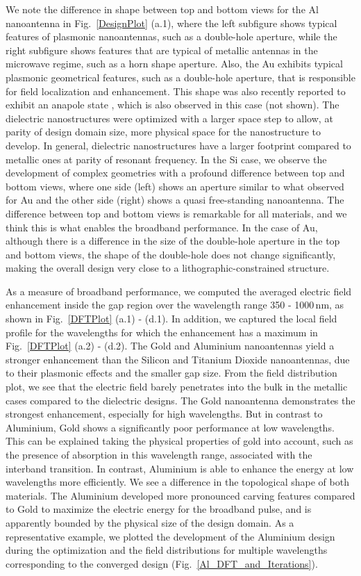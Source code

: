 \documentclass[aps,prl,twocolumn,superscriptaddress,longbibliography]{revtex4-1}
\begin{document}
We note the difference in shape between top and bottom views for the Al nanoantenna in Fig.~\ref{DesignPlot} (a.1), where the left subfigure shows typical features of plasmonic nanoantennas, such as a double-hole aperture, while the right subfigure shows features that are typical of metallic antennas in the microwave regime, such as a horn shape aperture. 
Also, the Au exhibits typical plasmonic geometrical features, such as a double-hole aperture, that is responsible for field localization and enhancement.
This shape was also recently reported to exhibit an anapole state \cite{anapolePaper}, which is also observed in this case (not shown). The dielectric nanostructures were optimized with a larger space step to allow, at parity of design domain size, more physical space for the nanostructure to develop. In general, dielectric nanostructures have a larger footprint compared to metallic ones at parity of resonant frequency. In the Si case, we observe the development of complex geometries with a profound difference between top and bottom views, where one side (left) shows an aperture similar to what observed for Au and the other side (right) shows a quasi free-standing nanoantenna.
The difference between top and bottom views is remarkable for all materials, and we think this is what enables the broadband performance. In the case of Au, although there is a difference in the size of the double-hole aperture in the top and bottom views, the shape of the double-hole does not change significantly, making the overall design very close to a lithographic-constrained structure.\par
As a measure of broadband performance, we computed the averaged electric field enhancement inside the gap region over the wavelength range 350 - 1000\,nm, as shown in Fig.~\ref{DFTPlot} (a.1) - (d.1). In addition, we captured the local field profile for the wavelengths for which the enhancement has a maximum in Fig.~\ref{DFTPlot} (a.2) - (d.2). The Gold and Aluminium nanoantennas yield a stronger enhancement than the Silicon and Titanium Dioxide nanoantennas, due to their plasmonic effects and the smaller gap size. From the field distribution plot, we see that the electric field barely penetrates into the bulk in the metallic cases compared to the dielectric designs. The Gold nanoantenna demonstrates the strongest enhancement, especially for high wavelengths. But in contrast to Aluminium, Gold shows a significantly poor performance at low wavelengths. This can be explained taking the physical properties of gold into account, such as the presence of absorption in this wavelength range, associated with the interband transition. In contrast, Aluminium is able to enhance the energy at low wavelengths more efficiently. We see a difference in the topological shape of both materials. The Aluminium developed more pronounced carving features compared to Gold to maximize the electric energy for the broadband pulse, and is apparently bounded by the physical size of the design domain. As a representative example, we plotted the development of the Aluminium design during the optimization and the field distributions for multiple wavelengths corresponding to the converged design (Fig.~\ref{Al_DFT_and_Iterations}).
\end{document}
